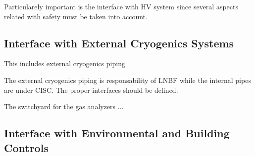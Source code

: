  


Particularely important is the interface with HV system since several aspects related with safety must be taken into account. 


\subsection{Interface with External Cryogenics Systems}
\label{sec:fdsp-slow-cryo-ext-cryo}



This includes external cryogenics piping 

The external cryogenics piping is responsability of LNBF while the internal pipes are under CISC. The proper interfaces should be defined.

The switchyard for the gas analyzers ... 



\subsection{Interface with Environmental and Building Controls}
\label{sec:fdsp-slow-cryo-slow-enviro}



